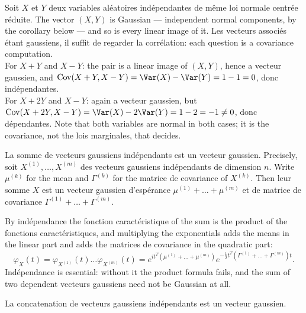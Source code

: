 \begin{example}
Soit $X$ et $Y$ deux variables aléatoires indépendantes de même loi normale
centrée réduite. The vector $(X,Y)$ is
Gaussian --- independent normal components, by the corollary below --- and so is
every linear image of it. Les vecteurs associés étant gaussiens, il suffit de
regarder la corrélation: each question is a covariance computation.\\

For $X+Y$ and $X-Y$: the pair is a linear image of $(X,Y)$, hence a vecteur
gaussien, and
$\Cov(X+Y, X-Y) = \Var(X) - \Var(Y) = 1 - 1 = 0$, donc indépendantes.\\

For $X+2Y$ and $X-Y$: again a vecteur gaussien, but
$\Cov(X+2Y, X-Y) = \Var(X) - 2\Var(Y) = 1 - 2 = -1 \neq 0$, donc dépendantes.
Note that both variables are normal in both cases; it is the
covariance, not the lois marginales, that decides.
\end{example}

\begin{theorem}[Somme]
La somme de vecteurs gaussiens indépendants est un vecteur gaussien. Precisely,
soit $X^{(1)},\dots,X^{(m)}$ des vecteurs gaussiens indépendants de dimension $n$.
Write $\mu^{(k)}$ for the mean and $\Gamma^{(k)}$ for the matrice de covariance
of $X^{(k)}$. Then leur somme $X$ est un vecteur gaussien d'espérance
$\mu^{(1)} + \dots + \mu^{(m)}$ et de matrice de covariance
$\Gamma^{(1)} + \dots + \Gamma^{(m)}$.
\end{theorem}

\begin{remark}
By indépendance the fonction caractéristique of the sum is the product of the
fonctions caractéristiques, and multiplying the exponentials adds the means in
the linear part and adds the matrices de covariance in the quadratic part:
\[
  \varphi_{X}(t) = \varphi_{X^{(1)}}(t) \dots \varphi_{X^{(m)}}(t)
    = e^{it^{T}\left(\mu^{(1)}+\dots+\mu^{(m)}\right)}
      e^{-\frac{1}{2}t^{T}\left(\Gamma^{(1)}+\dots+\Gamma^{(m)}\right)t} .
\]
Indépendance is essential: without it the product formula fails, and the sum of
two dependent vecteurs gaussiens need not be Gaussian at all.
\end{remark}

\begin{corollary}[Concatenation]
La concatenation de vecteurs gaussiens indépendants est un vecteur gaussien.
\end{corollary}

